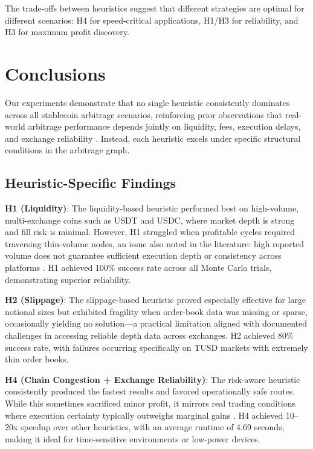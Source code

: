 \documentclass[11pt]{article}
\begin{document}
The trade-offs between heuristics suggest that different strategies are optimal for different scenarios: H4 for speed-critical applications, H1/H3 for reliability, and H3 for maximum profit discovery.

\section{Conclusions}

Our experiments demonstrate that no single heuristic consistently dominates across all stablecoin arbitrage scenarios, reinforcing prior observations that real-world arbitrage performance depends jointly on liquidity, fees, execution delays, and exchange reliability \cite{oanta2023arbitrage}. Instead, each heuristic excels under specific structural conditions in the arbitrage graph.

\subsection{Heuristic-Specific Findings}

\textbf{H1 (Liquidity)}: The liquidity-based heuristic performed best on high-volume, multi-exchange coins such as USDT and USDC, where market depth is strong and fill risk is minimal. However, H1 struggled when profitable cycles required traversing thin-volume nodes, an issue also noted in the literature: high reported volume does not guarantee sufficient execution depth or consistency across platforms \cite{oanta2023arbitrage}. H1 achieved 100\% success rate across all Monte Carlo trials, demonstrating superior reliability.

\textbf{H2 (Slippage)}: The slippage-based heuristic proved especially effective for large notional sizes but exhibited fragility when order-book data was missing or sparse, occasionally yielding no solution---a practical limitation aligned with documented challenges in accessing reliable depth data across exchanges. H2 achieved 80\% success rate, with failures occurring specifically on TUSD markets with extremely thin order books.

\textbf{H4 (Chain Congestion + Exchange Reliability)}: The risk-aware heuristic consistently produced the fastest results and favored operationally safe routes. While this sometimes sacrificed minor profit, it mirrors real trading conditions where execution certainty typically outweighs marginal gains \cite{oanta2023arbitrage}. H4 achieved 10--20x speedup over other heuristics, with an average runtime of 4.69 seconds, making it ideal for time-sensitive environments or low-power devices.
\end{document}
